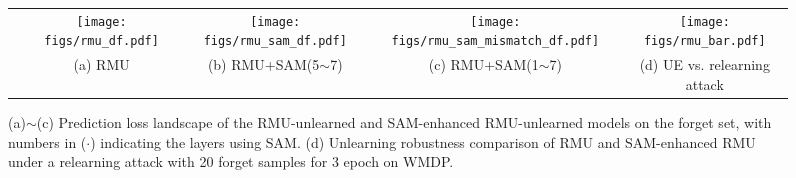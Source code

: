 \begin{figure*}[htb] %
\center

\begin{tabular}{ccccc}


\hspace*{-3mm}
\raisebox{-0.02\height}{\rotatebox{90}{\small{Loss landscape on $\mathcal{D}_\mathrm{f}$}}} \hspace*{-5mm} %

&
\hspace*{-3mm}
\texttt{[image: figs/rmu\_df.pdf]}
&
\hspace*{-3mm}
\texttt{[image: figs/rmu\_sam\_df.pdf]}
&
\hspace*{-3mm}
\texttt{[image: figs/rmu\_sam\_mismatch\_df.pdf]}
&
\texttt{[image: figs/rmu\_bar.pdf]}

\\


&
\hspace*{-3mm}
\small{(a) RMU}
&
\hspace*{-6mm}
\small{(b) RMU+SAM(5$\sim$7)}
&
\hspace*{-3mm}
\small{(c) RMU+SAM(1$\sim$7)}
&
\small{(d) UE vs. relearning attack}

\\
\end{tabular}

\vspace*{-2mm}
\caption{\small{(a)$\sim$(c) Prediction loss landscape of the RMU-unlearned and SAM-enhanced RMU-unlearned models on the forget set, with numbers in ($\cdot$) indicating the layers using SAM. (d) Unlearning robustness comparison of RMU and SAM-enhanced RMU under a relearning attack with 20 forget samples for 3 epoch on WMDP.
}}
\label{fig: loss_lanscape_rmu}
\end{figure*}


